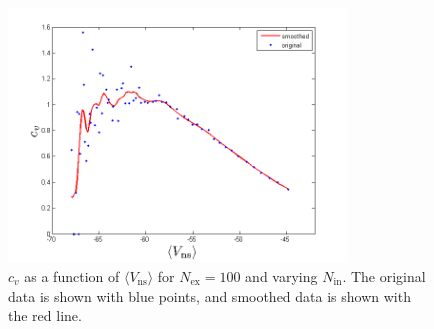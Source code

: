 \documentclass{scrartcl}
\begin{document}
\begin{figure}
\centering
\includegraphics[trim = {1.2cm 0 1cm 0.6cm}, width=0.8\textwidth, clip]{../pics/cv_aveV}
\caption{$c_v$ as a function of $\langle V_\mathrm{ns}\rangle$  for $N_\mathrm{ex}=100$ and varying $N_\mathrm{in}$. The original data is shown with blue points, and smoothed data is shown with the red line.}
\label{cv_aveV}
\end{figure}


\end{document}
